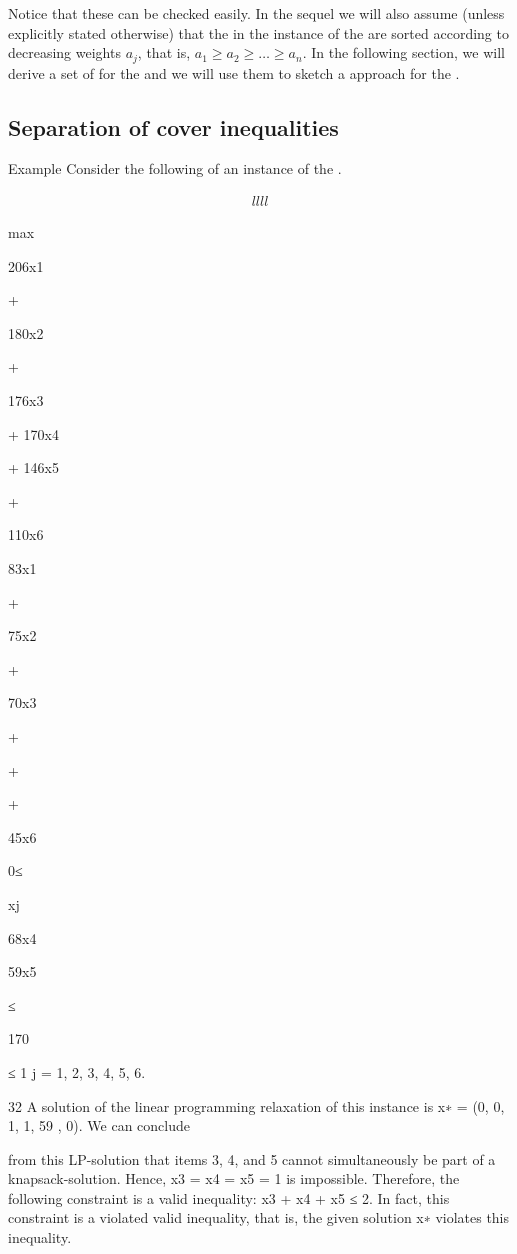 \begin{note}
Notice that these  can be checked easily. In the sequel we will also assume (unless explicitly stated otherwise) that the  in the instance of the  are sorted according to decreasing weights $a_j$, that is, $a_1\geq a_2\geq\ldots\geq a_n$. In the following section, we will derive a set of  for the  and we will use them to sketch a  approach for the .
\end{note}

\subsection{Separation of cover inequalities}

\begin{example}
Example Consider the following  of an instance of the .

\begin{align}{llll}

\end{align}

max

206x1

+

180x2

+

176x3

+ 170x4

+ 146x5

+

110x6

83x1

+

75x2

+

70x3

+

+

+

45x6

0≤

xj

68x4

59x5

≤

170

≤ 1 j = 1, 2, 3, 4, 5, 6.

32
A solution of the linear programming relaxation of this instance is x∗ = (0, 0, 1, 1, 59
, 0). We can conclude

from this LP-solution that items 3, 4, and 5 cannot simultaneously be part of a knapsack-solution. Hence,
x3 = x4 = x5 = 1 is impossible. Therefore, the following constraint is a valid inequality:
x3 + x4 + x5 ≤ 2.
In fact, this constraint is a violated valid inequality, that is, the given solution x∗ violates this inequality.
\end{example}

